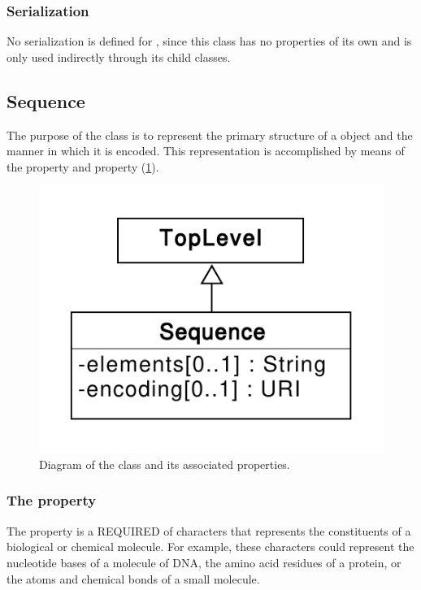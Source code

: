 \subsubsection*{Serialization}

No serialization is defined for , since this class has
no properties of its own and is only used indirectly through its child
classes.

\subsection{Sequence}
\label{sec:Sequence}
The purpose of the  class is to represent the primary structure of a  object and the manner in which it is encoded. This representation is accomplished  by means of the  property and  property (\ref{uml:sequence}).

\begin{figure}[ht]
\begin{center}
\includegraphics[scale=0.6]{uml/sequence}
\caption[]{Diagram of the  class and its associated properties.}
\label{uml:sequence}
\end{center}
\end{figure}


\subsubsection*{The  property}
\label{sec:elements}
The  property is a REQUIRED  of characters that represents the constituents of a biological or chemical molecule. For example, these characters could represent the nucleotide bases of a molecule of DNA, the amino acid residues of a protein, or the atoms and chemical bonds of a small molecule.


